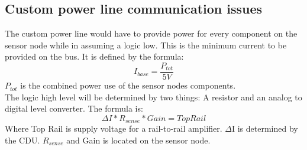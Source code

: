 \subsection{Custom power line communication issues}
The custom power line would have to provide power for every component on the sensor node while in assuming a logic low. This is the minimum current to be provided on the bus. It is defined by the formula:
\begin{equation}
I_{base} = \frac{P_{tot}}{5V}
\end{equation}
$P_{tot}$ is the combined power use of the sensor nodes components.\\
The logic high level will be determined by two things: A resistor and an analog to digital level converter. The formula is:
\begin{equation}
\Delta I * R_{sense} * Gain = Top Rail
\end{equation}
Where Top Rail is supply voltage for a rail-to-rail amplifier. $\Delta$I is determined by the CDU. $R_{sense}$ and Gain is located on the sensor node.
